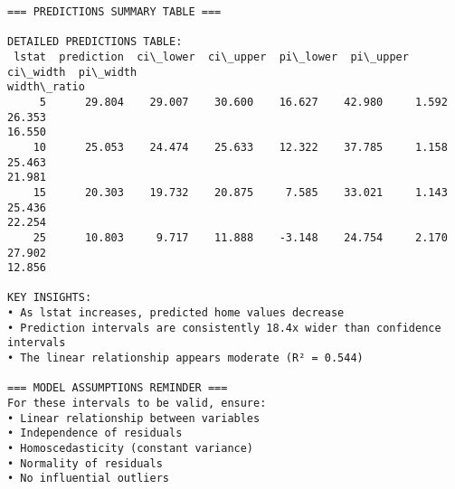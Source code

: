 \documentclass[11pt, twocolumn]{article}
\begin{document}
    \begin{Verbatim}[commandchars=\\\{\}]
=== PREDICTIONS SUMMARY TABLE ===

DETAILED PREDICTIONS TABLE:
 lstat  prediction  ci\_lower  ci\_upper  pi\_lower  pi\_upper  ci\_width  pi\_width
width\_ratio
     5      29.804    29.007    30.600    16.627    42.980     1.592    26.353
16.550
    10      25.053    24.474    25.633    12.322    37.785     1.158    25.463
21.981
    15      20.303    19.732    20.875     7.585    33.021     1.143    25.436
22.254
    25      10.803     9.717    11.888    -3.148    24.754     2.170    27.902
12.856

KEY INSIGHTS:
• As lstat increases, predicted home values decrease
• Prediction intervals are consistently 18.4x wider than confidence intervals
• The linear relationship appears moderate (R² = 0.544)

=== MODEL ASSUMPTIONS REMINDER ===
For these intervals to be valid, ensure:
• Linear relationship between variables
• Independence of residuals
• Homoscedasticity (constant variance)
• Normality of residuals
• No influential outliers
    \end{Verbatim}


    
    
    
\end{document}
